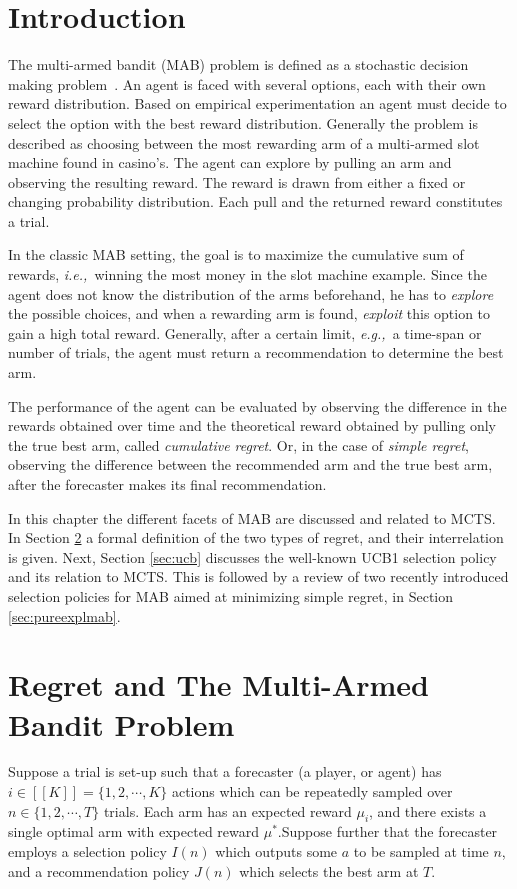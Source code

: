 \documentclass{kecsmstr}
\newcommand{\eg}{{\it e.g.,}~}
\newcommand{\ie}{{\it i.e.,}~}
\begin{document}
\section{Introduction}
The multi-armed bandit (MAB) problem is defined as a stochastic decision making problem~. An agent is faced with several options, each with their own reward distribution. Based on empirical experimentation an agent must decide to select the option with the best reward distribution. Generally the problem is described as choosing between the most rewarding arm of a multi-armed slot machine found in casino's. The agent can explore by pulling an arm and observing the resulting reward. The reward is drawn from either a fixed or changing probability distribution. Each pull and the returned reward constitutes a trial. 

In the classic MAB setting, the goal is to maximize the cumulative sum of rewards, \ie winning the most money in the slot machine example. Since the agent does not know the distribution of the arms beforehand, he has to \emph{explore} the possible choices, and when a rewarding arm is found, \emph{exploit} this option to gain a high total reward. Generally, after a certain limit, \eg a time-span or number of trials, the agent must return a recommendation to determine the best arm.

The performance of the agent can be evaluated by observing the difference in the rewards obtained over time and the theoretical reward obtained by pulling only the true best arm, called \emph{cumulative regret}. Or, in the case of \emph{simple regret}, observing the difference between the recommended arm and the true best arm, after the forecaster makes its final recommendation.
\vspace{2 mm}

In this chapter the different facets of MAB are discussed and related to MCTS. In Section \ref{sec:mabprob} a formal definition of the two types of regret, and their interrelation is given. Next, Section \ref{sec:ucb} discusses the well-known UCB1 selection policy and its relation to MCTS. This is followed by a review of two recently introduced selection policies for MAB aimed at minimizing simple regret, in Section \ref{sec:pureexplmab}.

\section{Regret and The Multi-Armed Bandit Problem}
\label{sec:mabprob}
Suppose a trial is set-up such that a forecaster (a player, or agent) has $i \in [[K]] = \{ 1, 2, \cdots , K \}$ actions which can be repeatedly sampled over $n \in \{ 1, 2, \cdots, T \}$ trials. Each arm has an expected reward $\mu_i$, and there exists a single optimal arm with expected reward $\mu^*$.Suppose further that the forecaster employs a selection policy $I(n)$ which outputs some $a$ to be sampled at time $n$, and a recommendation policy $J(n)$ which selects the best arm at $T$.
\end{document}

